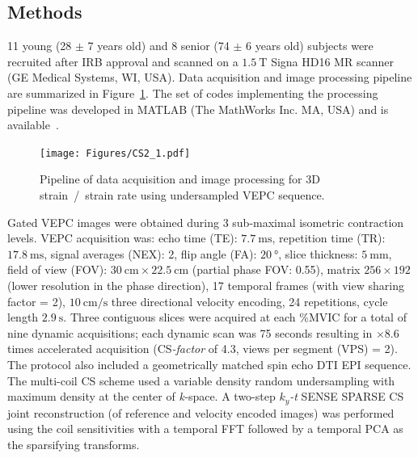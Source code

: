 \subsection{Methods}
11 young (28 $\pm$ 7 years old) and 8 senior (74 $\pm$ 6 years old) subjects were recruited after IRB approval and scanned on a $\SI{1.5}{\tesla}$ Signa HD16 MR scanner (GE Medical Systems, WI, USA).
Data acquisition and image processing pipeline are summarized in Figure~\ref{fig: CSYO1}. The set of codes implementing the processing pipeline was developed in MATLAB (The MathWorks Inc. MA, USA) and is available~\cite{3DSR}.
\begin{figure}
\vspace{+0.2cm}
\centering
\texttt{[image: Figures/CS2\_1.pdf]}
\caption[Pipeline of data acquisition and image processing for 3D strain~/~strain rate using undersampled VEPC sequence]{Pipeline of data acquisition and image processing for 3D strain~/~strain rate using undersampled VEPC sequence.}
\label{fig: CSYO1}
\end{figure}
Gated VEPC images were obtained during 3 sub-maximal isometric contraction levels.
VEPC acquisition was: echo time (TE): $\SI{7.7}{\milli\second}$, repetition time (TR): $\SI{17.8}{\milli\second}$, signal averages (NEX): 2, flip angle (FA): $\SI{20}{\degree}$, slice thickness: $\SI{5}{\milli\meter}$, field of view (FOV): $\SI{30}{\centi\meter} \times \SI{22.5}{\centi\meter}$ (partial phase FOV: 0.55), matrix $256 \times 192$ (lower resolution in the phase direction), 17 temporal frames (with view sharing factor = 2), $\SI{10}{\centi\meter/\second}$ three directional velocity encoding, 24 repetitions, cycle length $\SI{2.9}{\second}$.
Three contiguous slices were acquired at each \%MVIC for a total of nine dynamic acquisitions; each dynamic scan was 75 seconds resulting in $\times 8.6$ times accelerated acquisition (\mbox{CS\textit{-factor}} of 4.3, views per segment (VPS) = 2). 
The protocol also included a geometrically matched spin echo DTI EPI sequence.
The multi-coil CS scheme used a variable density random undersampling with maximum density at the center of \mbox{\textit{k-}space}. 
A two-step $k_y$\textit{-t} SENSE SPARSE CS joint reconstruction (of reference and velocity encoded images) was performed~\cite{RNCS10} using the coil sensitivities with a temporal FFT followed by a temporal PCA as the sparsifying transforms. 
